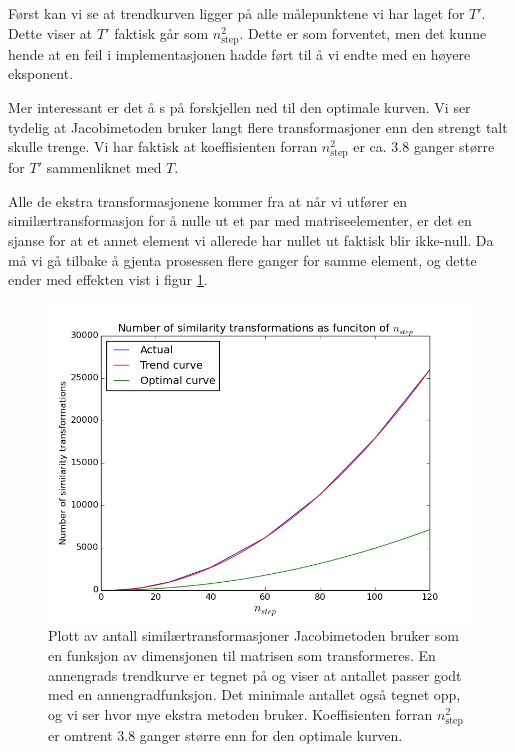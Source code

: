 \documentclass[11pt]{article}
\begin{document}
Først kan vi se at trendkurven ligger på alle målepunktene vi har
laget for $T'$. Dette viser at $T'$ faktisk går som
$n_\text{step}^2$. Dette er som forventet, men det kunne hende at en
feil i implementasjonen hadde ført til å vi endte med en høyere
eksponent.

Mer interessant er det å s på forskjellen ned til den optimale
kurven. Vi ser tydelig at Jacobimetoden bruker langt flere
transformasjoner enn den strengt talt skulle trenge. Vi har faktisk at
koeffisienten forran $n_\text{step}^2$ er ca. $3.8$ ganger større for
$T'$ sammenliknet med $T$. 

Alle de ekstra transformasjonene kommer fra at når vi utfører en
similærtransformasjon for å nulle ut et par med matriseelementer, er
det en sjanse for at et annet element vi allerede har nullet ut
faktisk blir ikke-null. Da må vi gå tilbake å gjenta prosessen flere
ganger for samme element, og dette ender med effekten vist i figur \ref{fig:number-of-transformations}.

\begin{figure}[ht]
  \centering
  \includegraphics[scale=0.5]{fig/number_of_transformations_trend_plot.jpg}
  \caption{\label{fig:number-of-transformations} Plott av antall
    similærtransformasjoner Jacobimetoden bruker som en funksjon av
    dimensjonen til matrisen som transformeres. En annengrads
    trendkurve er tegnet på og viser at antallet passer godt med en
    annengradfunksjon. Det minimale antallet også tegnet opp, og vi
    ser hvor mye ekstra metoden bruker. Koeffisienten forran
    $n_\text{step}^2$ er omtrent $3.8$ ganger større enn for den
    optimale kurven.}
\end{figure}
\end{document}
